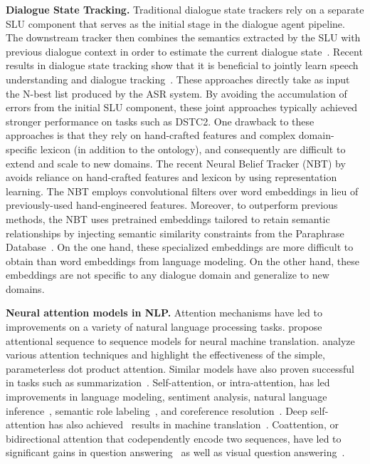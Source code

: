 \documentclass[11pt,a4paper]{article}
\begin{document}


\textbf{Dialogue State Tracking.}
Traditional dialogue state trackers rely on a separate SLU component that serves as the initial stage in the dialogue agent pipeline.
The downstream tracker then combines the semantics extracted by the SLU with previous dialogue context in order to estimate the current dialogue state~\cite{thomson2010bayesian,wang2013simple,williams2014web,perez2016dialog}.
Recent results in dialogue state tracking show that it is beneficial to jointly learn speech understanding and dialogue tracking~\cite{henderson2014word,zilka2015incremental,wen2017NetworkBasedEndToEndDialogueSystem}.
These approaches directly take as input the N-best list produced by the ASR system.
By avoiding the accumulation of errors from the initial SLU component, these joint approaches typically achieved stronger performance on tasks such as DSTC2.
One drawback to these approaches is that they rely on hand-crafted features and complex domain-specific lexicon (in addition to the ontology), and consequently are difficult to extend and scale to new domains.
The recent Neural Belief Tracker (NBT) by~\citet{mrkvsic2016neural} avoids reliance on hand-crafted features and lexicon by using representation learning.
The NBT employs convolutional filters over word embeddings in lieu of previously-used hand-engineered features.
Moreover, to outperform previous methods, the NBT uses pretrained embeddings tailored to retain semantic relationships by injecting semantic similarity constraints from the Paraphrase Database~\cite{wieting2015paraphrase,ganitkevitch2013ppdb}.
On the one hand, these specialized embeddings are more difficult to obtain than word embeddings from language modeling.
On the other hand, these embeddings are not specific to any dialogue domain and generalize to new domains.


\textbf{Neural attention models in NLP.}
Attention mechanisms have led to improvements on a variety of natural language processing tasks.
\citet{Bahdanau2014NeuralMT} propose attentional sequence to sequence models for neural machine translation.
\citet{luong2015effective} analyze various attention techniques and highlight the effectiveness of the simple, parameterless dot product attention.
Similar models have also proven successful in tasks such as summarization~\cite{see2017get,paulus2017deep}.
Self-attention, or intra-attention, has led improvements in language modeling, sentiment analysis, natural language inference~\cite{cheng2016long}, semantic role labeling~\cite{he2017deep}, and coreference resolution~\citep{lee2017end}.
Deep self-attention has also achieved \sota~results in machine translation~\cite{Vaswani2017attention}.
Coattention, or bidirectional attention that codependently encode two sequences, have led to significant gains in question answering~\cite{Xiong2016dynamic,seo2016bidirectional,xiong2018dcn} as well as visual question answering~\cite{lu2016hierarchical}.
\end{document}
